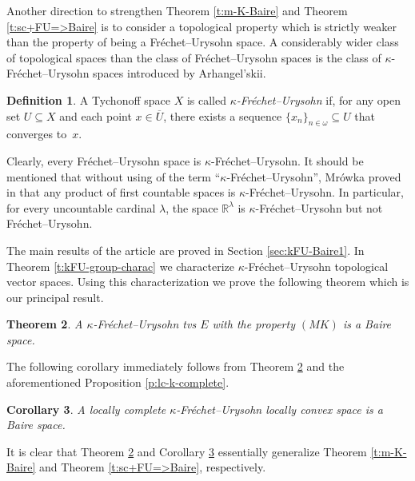 \documentclass[preprint,11pt]{elsarticle}
\newtheorem{theorem}{Theorem}[section]
\newtheorem{corollary}[theorem]{Corollary}
\theoremstyle{definition}
\newtheorem{definition}[theorem]{Definition}
\theoremstyle{remark}
\numberwithin{equation}{section}
\numberwithin{theorem}{section}
\newcommand{\w}{\omega}
\newcommand{\IR}{\mathbb{R}}
\begin{document}
Another direction to strengthen Theorem \ref{t:m-K-Baire} and Theorem \ref{t:sc+FU=>Baire} is to consider a topological property which is strictly weaker than the property of being a Fr\'{e}chet--Urysohn space. A considerably wider class of topological spaces than the class of Fr\'{e}chet--Urysohn spaces is the class of $\kappa$-Fr\'{e}chet--Urysohn spaces introduced by Arhangel'skii.

\begin{definition}\label{def:kFU}
A Tychonoff space $X$ is called {\em $\kappa$-Fr\'{e}chet--Urysohn} if, for any open set $U\subseteq X$ and each point $x\in \overline{U}$, there exists a sequence $\{x_n\}_{n\in \w}\subseteq U$ that converges to~$x$.
\end{definition}
\noindent Clearly, every Fr\'{e}chet--Urysohn space is $\kappa$-Fr\'{e}chet--Urysohn. It should be mentioned that without using of the term ``$\kappa$-Fr\'{e}chet--Urysohn'', Mr\'{o}wka proved in \cite{Mrowka} that any product of first countable spaces is  $\kappa$-Fr\'{e}chet--Urysohn. In particular, for every uncountable cardinal $\lambda$, the space $\IR^\lambda$ is $\kappa$-Fr\'{e}chet--Urysohn but not Fr\'{e}chet--Urysohn.

The main results of the article are proved in Section \ref{sec:kFU-Baire1}. In Theorem \ref{t:kFU-group-charac} we characterize $\kappa$-Fr\'{e}chet--Urysohn topological vector spaces. Using this characterization we prove the following theorem which is our principal result. %

\begin{theorem} \label{t:MK-Baire}
A $\kappa$-Fr\'{e}chet--Urysohn tvs $E$ with the property $(MK)$ is a Baire space.
\end{theorem}

The following corollary immediately follows from Theorem \ref{t:MK-Baire} and the aforementioned  Proposition \ref{p:lc-k-complete}.

\begin{corollary} \label{c:lc-kFU-Baire}
A locally complete $\kappa$-Fr\'{e}chet--Urysohn locally convex space is a Baire space.
\end{corollary}
\noindent It is clear that Theorem \ref{t:MK-Baire} and Corollary \ref{c:lc-kFU-Baire} essentially generalize Theorem \ref{t:m-K-Baire} and  Theorem  \ref{t:sc+FU=>Baire}, respectively.
\end{document}
